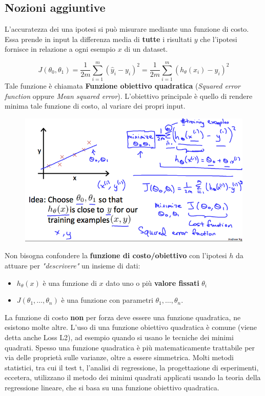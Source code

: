    \subsection{Nozioni aggiuntive}
   L'accuratezza dei una ipotesi si può misurare mediante una funzione di costo. Essa prende in input la differenza media di \textbf{tutte} i risultati $y$ che l'ipotesi fornisce in relazione a ogni esempio $x$ di un dataset.

\[J(\theta_0, \theta_1) = \dfrac {1}{2m} \displaystyle \sum _{i=1}^m \left ( \hat{y}_{i}- y_{i} \right)^2 = \dfrac {1}{2m} \displaystyle \sum _{i=1}^m \left (h_\theta (x_{i}) - y_{i} \right)^2\]
Tale funzione è chiamata \textbf{Funzione obiettivo quadratica} (\textit{Squared error function} oppure \textit{Mean squared error}). L'obiettivo principale è quello di rendere minima tale funzione di costo, al variare dei propri input. 
\begin{figure}[h!]
    \centering
    \includegraphics[width=1\textwidth]{img/R2YF5Lj3EeajLxLfjQiSjg_110c901f58043f995a35b31431935290_Screen-Shot-2016-12-02-at-5.23.31-PM.png}
\end{figure}
\begin{nota}
Non bisogna confondere la \textbf{funzione di costo/obiettivo} con l'ipotesi $h$ da attuare per \textit{"descrivere"} un insieme di dati:
\begin{itemize}
    \item $h_\theta(x)$ è una funzione di $x$ dato uno o più \textbf{valore fissati} $\theta_i$
    \item $J(\theta_1, \dots, \theta_n)$ è una funzione con parametri $\theta_1, \dots, \theta_n$.
\end{itemize}
\end{nota}
\begin{nota}
La funzione di costo \textbf{non} per forza deve essere una funzione quadratica, ne esistono molte altre. L'uso di una funzione obiettivo quadratica è comune (viene detta anche Loss L2), ad esempio quando si usano le tecniche dei minimi quadrati. Spesso una funzione quadratica è più matematicamente trattabile per via delle proprietà sulle varianze, oltre a essere simmetrica. 
Molti metodi statistici, tra cui il test t, l'analisi di regressione, la progettazione di esperimenti, eccetera, utilizzano il metodo dei minimi quadrati applicati usando la teoria della regressione lineare, che si basa su una funzione obiettivo quadratica. 
\end{nota}
